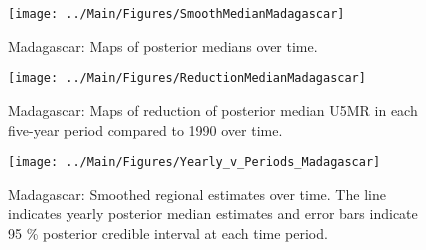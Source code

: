 \documentclass[12pt]{article}\usepackage[]{graphicx}\usepackage[]{color}
\newenvironment{knitrout}{}{} %
\begin{document}
\begin{knitrout}
\color{fgcolor}\begin{figure}[bht]

{\centering \texttt{[image: ../Main/Figures/SmoothMedianMadagascar]} 

}

\caption[Madagascar]{Madagascar: Maps of posterior medians over time.}\label{fig:unnamed-chunk-194}
\end{figure}


\end{knitrout}
\begin{knitrout}
\color{fgcolor}\begin{figure}[bht]

{\centering \texttt{[image: ../Main/Figures/ReductionMedianMadagascar]} 

}

\caption[Madagascar]{Madagascar: Maps of reduction of posterior median U5MR in each five-year period compared to 1990 over time.}\label{fig:unnamed-chunk-195}
\end{figure}


\end{knitrout}
\begin{knitrout}
\color{fgcolor}\begin{figure}[bht]

{\centering \texttt{[image: ../Main/Figures/Yearly\_v\_Periods\_Madagascar]} 

}

\caption[Madagascar]{Madagascar: Smoothed regional estimates over time. The line indicates yearly posterior median estimates and error bars indicate 95 \% posterior credible interval at each time period.}\label{fig:unnamed-chunk-196}
\end{figure}


\end{knitrout}
\end{document}
